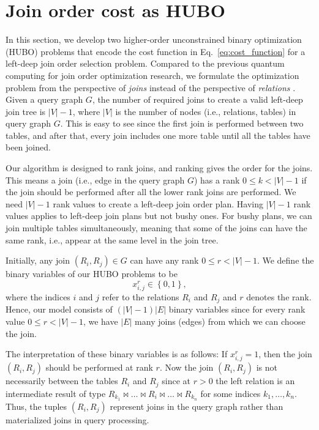 \section{Join order cost as HUBO}

In this section, we develop two higher-order unconstrained binary optimization (HUBO) problems that encode the cost function in Eq.~\eqref{eq:cost_function} for a left-deep join order selection problem. Compared to the previous quantum computing for join order optimization research, we formulate the optimization problem from the perspective of \textit{joins} instead of the perspective of \textit{relations} \cite{Schonberger_Scherzinger_Mauerer}. Given a query graph $G$, the number of required joins to create a valid left-deep join tree is $|V| - 1$, where $|V|$ is the number of nodes (i.e., relations, tables) in query graph $G$. This is easy to see since the first join is performed between two tables, and after that, every join includes one more table until all the tables have been joined.

Our algorithm is designed to rank joins, and ranking gives the order for the joins. This means a join (i.e., edge in the query graph $G$) has a rank $0 \leq k < |V| - 1$ if the join should be performed after all the lower rank joins are performed. We need $|V| - 1$ rank values to create a left-deep join order plan. Having $|V| - 1$ rank values applies to left-deep join plans but not bushy ones. For bushy plans, we can join multiple tables simultaneously, meaning that some of the joins can have the same rank, i.e., appear at the same level in the join tree.

Initially, any join $(R_i, R_j) \in G$ can have any rank $0 \leq r < |V| - 1$. We define the binary variables of our HUBO problems to be
\begin{equation}\label{def:binary_variables}
    x_{i,j}^{r} \in \left\{0, 1 \right\},
\end{equation}
where the indices $i$ and $j$ refer to the relations $R_i$ and $R_j$ and $r$ denotes the rank. Hence, our model consists of $(|V|- 1)|E|$ binary variables since for every rank value $0 \leq r < |V| - 1$, we have $|E|$ many joins (edges) from which we can choose the join.

The interpretation of these binary variables is as follows: If $x_{i,j}^{r} = 1$, then the join $(R_i, R_j)$ should be performed at rank $r$. Now the join $(R_i, R_j)$ is not necessarily between the tables $R_i$ and $R_j$ since at $r > 0$ the left relation is an intermediate result of type $R_{k_1} \bowtie \ldots \bowtie R_i \bowtie \ldots \bowtie R_{k_n}$ for some indices $k_1, \ldots, k_n$. Thus, the tuples $(R_i, R_j)$ represent joins in the query graph rather than materialized joins in query processing.


